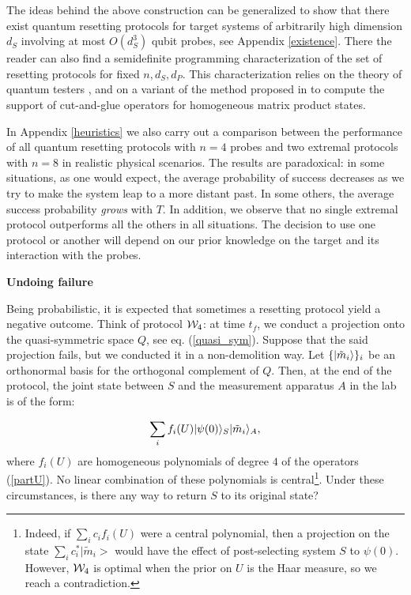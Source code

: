\documentclass[twocolumn,prx,aps,longbibliography]{revtex4-1}
\def\be{\begin{equation}}
\def\ee{\end{equation}}
\begin{document}
The ideas behind the above construction can be generalized to show that there exist quantum resetting protocols for target systems of arbitrarily high dimension $d_S$ involving at most $O(d_S^3)$ qubit probes, see Appendix \ref{existence}. There the reader can also find a semidefinite programming \cite{sdp} characterization of the set of resetting protocols for fixed $n, d_S,d_P$. This characterization relies on the theory of quantum testers \cite{tester}, \cite{tester2} and on a variant of the method proposed in \cite{MPS} to compute the support of cut-and-glue operators for homogeneous matrix product states. 

In Appendix \ref{heuristics} we also carry out a comparison between the performance of all quantum resetting protocols with $n=4$ probes and two extremal protocols with $n=8$ in realistic physical scenarios. The results are paradoxical: in some situations, as one would expect, the average probability of success decreases as we try to make the system leap to a more distant past. In some others, the average success probability \emph{grows} with $T$. In addition, we observe that no single extremal protocol outperforms all the others in all situations. The decision to use one protocol or another will depend on our prior knowledge on the target and its interaction with the probes.

\vspace{10pt}
\noindent\textbf{Undoing failure}

Being probabilistic, it is expected that sometimes a resetting protocol yield a negative outcome. Think of protocol ${\cal W}_4$: at time $t_f$, we conduct a projection onto the quasi-symmetric space $Q$, see eq. (\ref{quasi_sym}). Suppose that the said projection fails, but we conducted it in a non-demolition way. Let $\{|\tilde{m}_i\rangle\}_i$ be an orthonormal basis for the orthogonal complement of $Q$. Then, at the end of the protocol, the joint state between $S$ and the measurement apparatus $A$ in the lab is of the form:

\be
\sum_{i} f_i(U)\ket{\psi(0)}_S\ket{\tilde{m}_i}_A,
\ee
\noindent where $f_i(U)$ are homogeneous polynomials of degree $4$ of the operators (\ref{partU}). No linear combination of these polynomials is central\footnote{Indeed, if $\sum_i c_if_i(U)$ were a central polynomial, then a projection on the state $\sum_i c^*_i |\tilde{m}_i>$ would have the effect of post-selecting system $S$ to $\psi(0)$. However, ${\cal W}_4$ is optimal when the prior on $U$ is the Haar measure, so we reach a contradiction.}. Under these circumstances, is there any way to return $S$ to its original state?
\end{document}
